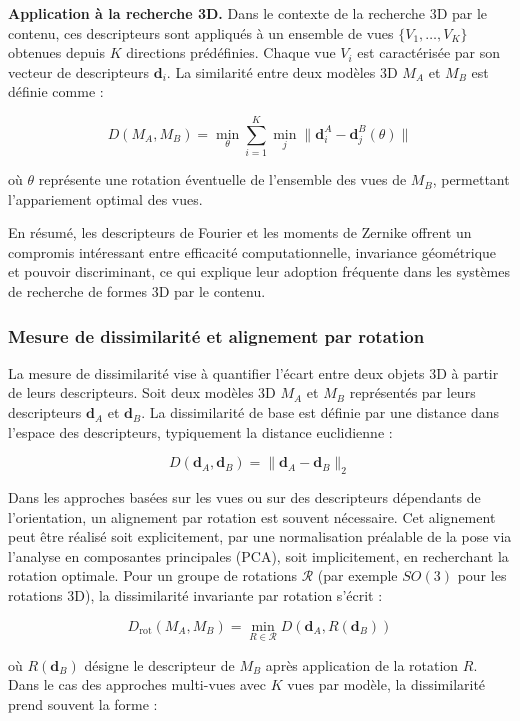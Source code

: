 \documentclass[11pt,a4paper,oneside]{report}
\begin{document}
\textbf{Application à la recherche 3D.} Dans le contexte de la recherche 3D par le contenu, ces descripteurs sont appliqués à un ensemble de vues $\{V_1, \ldots, V_K\}$ obtenues depuis $K$ directions prédéfinies. Chaque vue $V_i$ est caractérisée par son vecteur de descripteurs $\mathbf{d}_i$. La similarité entre deux modèles 3D $M_A$ et $M_B$ est définie comme :

$$
D(M_A, M_B) = \min_{\theta} \sum_{i=1}^K \min_j \|\mathbf{d}_i^A - \mathbf{d}_j^B(\theta)\|
$$

où $\theta$ représente une rotation éventuelle de l'ensemble des vues de $M_B$, permettant l'appariement optimal des vues.

En résumé, les descripteurs de Fourier et les moments de Zernike offrent un compromis intéressant entre efficacité computationnelle, invariance géométrique et pouvoir discriminant, ce qui explique leur adoption fréquente dans les systèmes de recherche de formes 3D par le contenu.

\subsubsection{Mesure de dissimilarité et alignement par rotation}

La mesure de dissimilarité vise à quantifier l'écart entre deux objets 3D à partir de leurs descripteurs. Soit deux modèles 3D $M_A$ et $M_B$ représentés par leurs descripteurs $\mathbf{d}_A$ et $\mathbf{d}_B$. La dissimilarité de base est définie par une distance dans l'espace des descripteurs, typiquement la distance euclidienne :

$$D(\mathbf{d}_A, \mathbf{d}_B) = \|\mathbf{d}_A - \mathbf{d}_B\|_2$$

Dans les approches basées sur les vues ou sur des descripteurs dépendants de l'orientation, un alignement par rotation est souvent nécessaire. Cet alignement peut être réalisé soit explicitement, par une normalisation préalable de la pose via l'analyse en composantes principales (PCA), soit implicitement, en recherchant la rotation optimale. Pour un groupe de rotations $\mathcal{R}$ (par exemple $SO(3)$ pour les rotations 3D), la dissimilarité invariante par rotation s'écrit :

$$D_{\text{rot}}(M_A, M_B) = \min_{R \in \mathcal{R}} D(\mathbf{d}_A, R(\mathbf{d}_B))$$

où $R(\mathbf{d}_B)$ désigne le descripteur de $M_B$ après application de la rotation $R$. Dans le cas des approches multi-vues avec $K$ vues par modèle, la dissimilarité prend souvent la forme :
\end{document}
